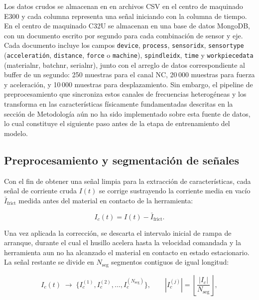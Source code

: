 \documentclass[12pt, letterpaper]{article}
\begin{document}
Los datos crudos se almacenan en en archivos CSV en el centro de maquinado E300 y cada columna representa una señal iniciando con la columna de tiempo. En el centro de maquinado C32U se almacenan en una base de datos MongoDB, con un documento escrito por segundo para cada combinación de sensor y eje. Cada documento incluye los campos \texttt{device}, \texttt{process}, \texttt{sensoridx}, \texttt{sensortype} (\texttt{acceleratión}, \texttt{distance}, \texttt{force} o \texttt{machine}), \texttt{spindleidx}, \texttt{time} y \texttt{workpiecedata} (materialnr, batchnr, serialnr), junto con el arreglo de datos correspondiente al buffer de un segundo: 250 muestras para el canal NC, 20\,000 muestras para fuerza y aceleración, y 10\,000 muestras para desplazamiento. Sin embargo, el pipeline de preprocesamiento que sincroniza estos canales de frecuencias heterogéneas y los transforma en las características físicamente fundamentadas descritas en la sección de Metodología aún no ha sido implementado sobre esta fuente de datos, lo cual constituye el siguiente paso antes de la etapa de entrenamiento del modelo.

\subsection{Preprocesamiento y segmentación de señales}
\label{sec:preprocesamiento}

Con el fin de obtener una señal limpia para la extracción de características, cada señal de corriente cruda $I(t)$ se corrige sustrayendo la corriente media en vacío $\bar{I}_{\text{frict}}$ medida antes del material en contacto de la herramienta:

\begin{equation}
  I_c(t) = I(t) - \bar{I}_{\text{frict}}.
  \label{eq:Ic}
\end{equation}

Una vez aplicada la corrección, se descarta el intervalo inicial de rampa de arranque, durante el cual el husillo acelera hasta la velocidad comandada y la herramienta aun no ha alcanzado el material en contacto en estado estacionario. La señal restante se divide en $N_{\text{seg}}$ segmentos contiguos de igual longitud:

\begin{equation}
  I_c(t) \;\longrightarrow\; \bigl\{I_c^{(1)}, I_c^{(2)}, \dots, I_c^{(N_{\text{seg}})}\bigr\}, \qquad
  |I_c^{(j)}| = \left\lfloor \frac{|I_c|}{N_{\text{seg}}} \right\rfloor,
  \label{eq:segmentacion}
\end{equation}
\end{document}
